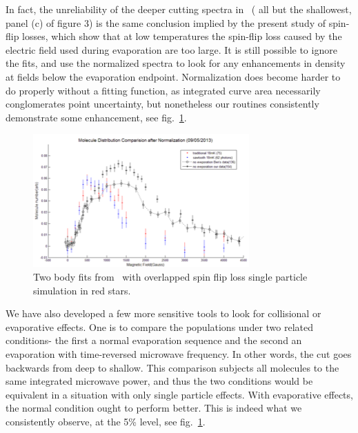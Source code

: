\documentclass[%
 reprint,
 amsmath,amssymb,
 aps,
prl,
]{revtex4-1}
\begin{document}
In fact, the unreliability of the deeper cutting spectra in~\cite{Stuhl2012evap} ( all but the shallowest, panel (c) of figure 3) is the same conclusion implied by the present study of spin-flip losses, which show that at low temperatures the spin-flip loss caused by the electric field used during evaporation are too large. It is still possible to ignore the fits, and use the normalized spectra to look for any enhancements in density at fields below the evaporation endpoint. Normalization does become harder to do properly without a fitting function, as integrated curve area necessarily conglomerates point uncertainty, but nonetheless our routines consistently demonstrate some enhancement, see fig.~\ref{fig:normenhance}.

\begin{figure}[tb]
\includegraphics[width=\linewidth]{SuppFigs/NormEnhance.png}%
\caption{
Two body fits from~\cite{Stuhl2013} with overlapped spin flip loss single particle simulation in red stars.
}
\label{fig:normenhance}
\end{figure}

We have also developed a few more sensitive tools to look for collisional or evaporative effects. One is to compare the populations under two related conditions- the first a normal evaporation sequence and the second an evaporation with time-reversed microwave frequency. In other words, the cut goes backwards from deep to shallow. This comparison subjects all molecules to the same integrated microwave power, and thus the two conditions would be equivalent in a situation with only single particle effects. With evaporative effects, the normal condition ought to perform better. This is indeed what we consistently observe, at the 5\% level, see fig.~\ref{fig:normenhance}.
\end{document}
